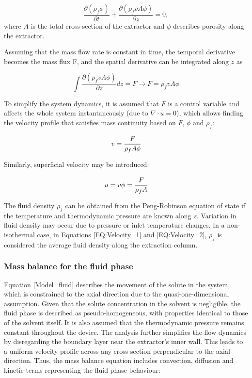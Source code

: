 \documentclass[a4paper,fleqn]{cas-dc}
\begin{document}
	{\footnotesize
		\begin{equation} \label{EQ: Continuity_differential}
			\frac{\partial (\rho_f \phi)}{\partial t} + \frac{\partial (\rho_f v A\phi)}{\partial z} = 0,
		\end{equation}
	}
	where $A$ is the total cross-section of the extractor and $\phi$ describes porosity along the extractor.
	
	Assuming that the mass flow rate is constant in time, the temporal derivative becomes the mass flux F, and the spatial derivative can be integrated along $z$ as
	
	{\footnotesize
		\begin{equation}
			\int \frac{\partial (\rho_f v A \phi )}{\partial z} dz = F \rightarrow F=\rho_f v A\phi
		\end{equation}
	}
	
	To simplify the system dynamics, it is assumed that $F$ is a control variable and affects the whole system instantaneously (due to $\nabla \cdot u = 0$), which allows finding the velocity profile that satisfies mass continuity based on $F$, $\phi$ and $\rho_f$:
	
	{\footnotesize
		\begin{equation} \label{EQ:Velocity_1}
			v = \cfrac{F}{\rho_f A\phi} 
		\end{equation}
	}
	
	Similarly, superficial velocity may be introduced:
	
	{\footnotesize
		\begin{equation} \label{EQ:Velocity_2}
			u = v \phi = \cfrac{F}{\rho_f A }
		\end{equation}
	}
	
	The fluid density $\rho_f$ can be obtained from the Peng-Robinson equation of state if the temperature and thermodynamic pressure are known along $z$. Variation in fluid density may occur due to pressure or inlet temperature changes. In a non-isothermal case, in Equations \ref{EQ:Velocity_1} and \ref{EQ:Velocity_2}, $\rho_f$ is considered the average fluid density along the extraction column.
	
	\subsubsection{Mass balance for the fluid phase} \label{CH: Mass_balance_fluid}
	
	Equation \ref{Model_fluid} describes the movement of the solute in the system, which is constrained to the axial direction due to the quasi-one-dimensional assumption. Given that the solute concentration in the solvent is negligible, the fluid phase is described as pseudo-homogeneous, with properties identical to those of the solvent itself. It is also assumed that the thermodynamic pressure remains constant throughout the device. The analysis further simplifies the flow dynamics by disregarding the boundary layer near the extractor's inner wall. This leads to a uniform velocity profile across any cross-section perpendicular to the axial direction. Thus, the mass balance equation includes convection, diffusion and kinetic terms representing the fluid phase behaviour:
	
\end{document}
